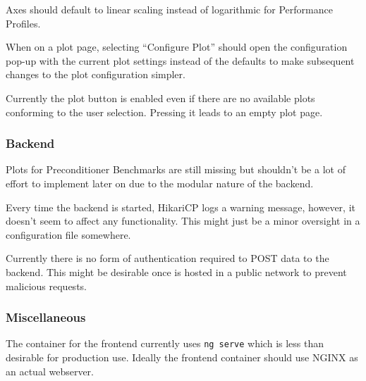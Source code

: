 {Axes should default to linear scaling instead of logarithmic for Performance Profiles.}

{When on a plot page, selecting \enquote{Configure Plot} should open the configuration pop-up with the current plot settings instead of the defaults to make subsequent changes to the plot configuration simpler.}

{Currently the plot button is enabled even if there are no available plots conforming to the user selection. Pressing it leads to an empty plot page.}

\subsubsection{Backend}

{Plots for Preconditioner Benchmarks are still missing but shouldn't be a lot of effort to implement later on due to the modular nature of the backend.}

{Every time the backend is started, HikariCP logs a warning message, however, it doesn't seem to affect any functionality. This might just be a minor oversight in a configuration file somewhere.}

{Currently there is no form of authentication required to POST data to the backend. This might be desirable once \parkview{} is hosted in a public network to prevent malicious requests.}

\subsubsection{Miscellaneous}

{The container for the frontend currently uses \texttt{ng serve} which is less than desirable for production use. Ideally the frontend container should use NGINX as an actual webserver.}
